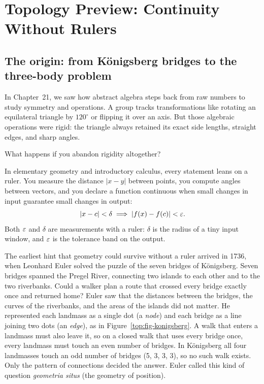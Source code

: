 \section{Topology Preview: Continuity Without Rulers}
\chapterline

\subsection{The origin: from Königsberg bridges to the three-body problem}

In Chapter~21, we saw how abstract algebra steps back from raw numbers to study symmetry and operations. A group tracks transformations like rotating an equilateral triangle by $120^\circ$ or flipping it over an axis. But those algebraic operations were rigid: the triangle always retained its exact side lengths, straight edges, and sharp angles.

What happens if you abandon rigidity altogether?

In elementary geometry and introductory calculus, every statement leans on a ruler. You measure the distance $|x - y|$ between points, you compute angles between vectors, and you declare a function continuous when small changes in input guarantee small changes in output:
\[
|x - c| < \delta \implies |f(x) - f(c)| < \varepsilon.
\]
Both $\varepsilon$ and $\delta$ are measurements with a ruler: $\delta$ is the radius of a tiny input window, and $\varepsilon$ is the tolerance band on the output.

The earliest hint that geometry could survive without a ruler arrived in 1736, when Leonhard Euler solved the puzzle of the seven bridges of K\"onigsberg. Seven bridges spanned the Pregel River, connecting two islands to each other and to the two riverbanks. Could a walker plan a route that crossed every bridge exactly once and returned home? Euler saw that the distances between the bridges, the curves of the riverbanks, and the areas of the islands did not matter. He represented each landmass as a single dot (a \emph{node}) and each bridge as a line joining two dots (an \emph{edge}), as in Figure~\ref{top:fig-konigsberg}. A walk that enters a landmass must also leave it, so on a closed walk that uses every bridge once, every landmass must touch an even number of bridges. In K\"onigsberg all four landmasses touch an odd number of bridges (5, 3, 3, 3), so no such walk exists. Only the pattern of connections decided the answer. Euler called this kind of question \emph{geometria situs} (the geometry of position).

